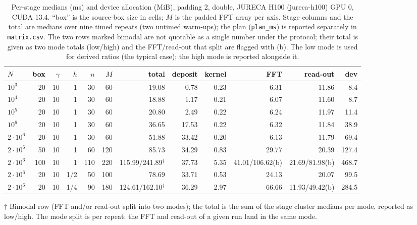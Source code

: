 \begin{table}[t]
\centering
\small
\setlength{\tabcolsep}{4pt}
\caption{Per-stage medians (ms) and device allocation (MiB), padding 2,
double, JURECA H100 (jureca-h100) GPU 0, CUDA 13.4. ``box'' is the
source-box size in cells; $M$ is the padded FFT array per axis. Stage
columns and the total are medians over nine timed repeats (two untimed
warm-ups); the plan (\texttt{plan\_ms}) is reported separately in
\texttt{matrix.csv}. The two rows marked bimodal are not quotable as a
single number under the protocol; their total is given as two mode totals
(low/high) and the FFT/read-out that split are flagged with (b). The
low mode is used for derived ratios (the typical case); the high mode is
reported alongside it.}
\label{tab:matrix}
\begin{tabular}{lrrrrrrrrrrr}
\toprule
$N$ & box & $\gamma$ & $h$ & $n$ & $M$ & total & deposit & kernel & FFT & read-out & dev \\
\midrule
 $10^3$   & 20  & 10  & 1   & 30  & 60  & 19.08  & 0.78  & 0.23 & 6.31  & 11.86 & 8.4  \\
 $10^4$   & 20  & 10  & 1   & 30  & 60  & 18.88  & 1.17  & 0.21 & 6.07  & 11.60 & 8.7  \\
$10^5$   & 20  & 10  & 1   & 30  & 60  & 20.80  & 2.49  & 0.22 & 6.24  & 11.97 & 11.4 \\
$10^6$   & 20  & 10  & 1   & 30  & 60  & 36.65  & 17.53 & 0.22 & 6.32  & 11.84 & 38.9 \\
$2\!\cdot\!10^6$ & 20  & 10  & 1   & 30  & 60  & 51.88  & 33.42 & 0.20 & 6.13  & 11.79 & 69.4 \\
$2\!\cdot\!10^6$ & 50  & 10  & 1   & 60  & 120 & 85.73  & 34.29 & 0.83 & 29.77 & 20.39 & 127.4 \\
$2\!\cdot\!10^6$ & 100 & 10  & 1   & 110 & 220 & 115.99/241.89$^{\dagger}$ & 37.73 & 5.35 & 41.01/106.62(b) & 21.69/81.98(b) & 468.7 \\
$2\!\cdot\!10^6$ & 20  & 10  & 1/2 & 50  & 100 & 78.69  & 33.71 & 0.53 & 24.13 & 20.07 & 99.5  \\
$2\!\cdot\!10^6$ & 20  & 10  & 1/4 & 90  & 180 & 124.61/162.10$^{\dagger}$ & 36.29 & 2.97 & 66.66 & 11.93/49.42(b) & 284.5 \\
\bottomrule
\end{tabular}

{\small $\dagger$ Bimodal row (FFT and/or read-out split into two modes);
the total is the sum of the stage cluster medians per mode, reported as
low/high. The mode split is per repeat: the FFT and read-out of a given
run land in the same mode.}
\end{table}

